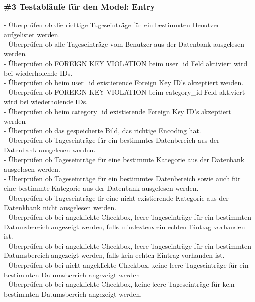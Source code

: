 \subsubsection*{\#3 Testabläufe für den Model: Entry}
- Überprüfen ob die richtige Tageseinträge für ein bestimmten Benutzer aufgelistet werden.\\
- Überprüfen ob alle Tageseinträge vom Benutzer aus der Datenbank ausgelesen werden.\\
- Überprüfen ob FOREIGN KEY VIOLATION beim user\_id Feld aktiviert wird bei wiederholende IDs.\\
- Überprüfen ob beim user\_id existierende Foreign Key ID's akzeptiert werden.\\
- Überprüfen ob FOREIGN KEY VIOLATION beim category\_id Feld aktiviert wird bei wiederholende IDs.\\
- Überprüfen ob beim category\_id existierende Foreign Key ID's akzeptiert werden.\\
- Überprüfen ob das gespeicherte Bild, das richtige Encoding hat.\\
- Überprüfen ob Tageseinträge für ein bestimmtes Datenbereich aus der Datenbank ausgelesen werden.\\
- Überprüfen ob Tageseinträge für eine bestimmte Kategorie aus der Datenbank ausgelesen werden.\\
- Überprüfen ob Tageseinträge für ein bestimmtes Datenbereich sowie auch für eine bestimmte Kategorie aus der Datenbank ausgelesen werden.\\
- Überprüfen ob Tageseinträge fir eine nicht existierende Kategorie aus der Datenkbank nicht ausgelesen werden.\\
- Überprüfen ob bei angeklickte Checkbox, leere Tageseinträge für ein bestimmten Datumsbereich angezeigt werden, falls mindestens ein echten Eintrag vorhanden ist.\\
- Überprüfen ob bei angeklickte Checkbox, leere Tageseinträge für ein bestimmten Datumsbereich angezeigt werden, falls kein echten Eintrag vorhanden ist.\\
- Überprüfen ob bei nicht angeklickte Checkbox, keine leere Tageseinträge für ein bestimmten Datumsbereich angezeigt werden.\\
- Überprüfen ob bei angeklickte Checkbox, keine leere Tageseinträge für kein bestimmten Datumsbereich angezeigt werden.

